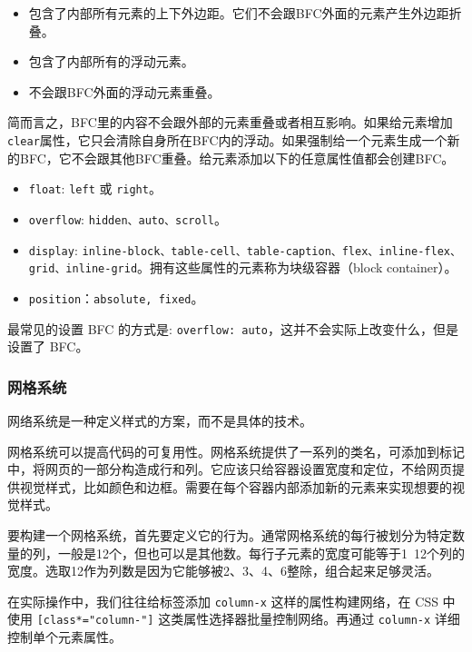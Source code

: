 \begin{itemize}
    \item 包含了内部所有元素的上下外边距。它们不会跟BFC外面的元素产生外边距折叠。
    \item 包含了内部所有的浮动元素。
    \item 不会跟BFC外面的浮动元素重叠。
\end{itemize}

简而言之，BFC里的内容不会跟外部的元素重叠或者相互影响。如果给元素增加\texttt{clear}属性，它只会清除自身所在BFC内的浮动。如果强制给一个元素生成一个新的BFC，它不会跟其他BFC重叠。给元素添加以下的任意属性值都会创建BFC。

\begin{itemize}
    \item \texttt{float}: \texttt{left} 或 \texttt{right}。
    \item \texttt{overflow}: \texttt{hidden、auto、scroll}。
    \item \texttt{display}: \texttt{inline-block、table-cell、table-caption、flex、inline-flex、grid、inline-grid}。拥有这些属性的元素称为块级容器（block container）。
    \item \texttt{position}：\texttt{absolute, fixed}。
\end{itemize}

最常见的设置 BFC 的方式是: \texttt{overflow: auto}，这并不会实际上改变什么，但是设置了 BFC。

\subsubsection*{网格系统}

网络系统是一种定义样式的方案，而不是具体的技术。

网格系统可以提高代码的可复用性。网格系统提供了一系列的类名，可添加到标记中，将网页的一部分构造成行和列。它应该只给容器设置宽度和定位，不给网页提供视觉样式，比如颜色和边框。需要在每个容器内部添加新的元素来实现想要的视觉样式。

要构建一个网格系统，首先要定义它的行为。通常网格系统的每行被划分为特定数量的列，一般是12个，但也可以是其他数。每行子元素的宽度可能等于1~12个列的宽度。选取12作为列数是因为它能够被2、3、4、6整除，组合起来足够灵活。

在实际操作中，我们往往给标签添加 \texttt{column-x} 这样的属性构建网络，在 CSS 中使用 \texttt{[class*="column-"]} 这类属性选择器批量控制网络。再通过 \texttt{column-x} 详细控制单个元素属性。

\newpage